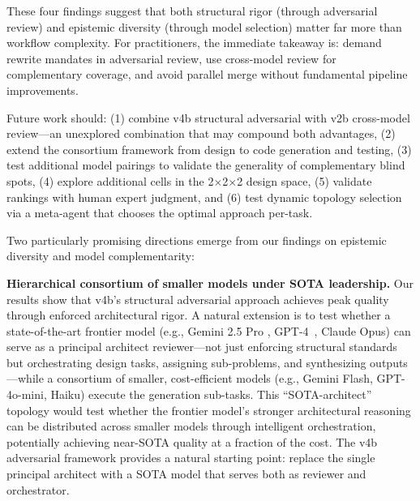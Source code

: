 \documentclass[conference]{IEEEtran}
\begin{document}
These four findings suggest that both structural rigor (through adversarial review) and epistemic diversity (through model selection) matter far more than workflow complexity. For practitioners, the immediate takeaway is: demand rewrite mandates in adversarial review, use cross-model review for complementary coverage, and avoid parallel merge without fundamental pipeline improvements.

Future work should: (1) combine v4b structural adversarial with v2b cross-model review---an unexplored combination that may compound both advantages, (2) extend the consortium framework from design to code generation and testing, (3) test additional model pairings to validate the generality of complementary blind spots, (4) explore additional cells in the 2$\times$2$\times$2 design space, (5) validate rankings with human expert judgment, and (6) test dynamic topology selection via a meta-agent that chooses the optimal approach per-task.

Two particularly promising directions emerge from our findings on epistemic diversity and model complementarity:

\textbf{Hierarchical consortium of smaller models under SOTA leadership.} Our results show that v4b's structural adversarial approach achieves peak quality through enforced architectural rigor. A natural extension is to test whether a state-of-the-art frontier model (e.g., Gemini 2.5 Pro \cite{gemini}, GPT-4~\cite{gpt4}, Claude Opus) can serve as a principal architect reviewer---not just enforcing structural standards but orchestrating design tasks, assigning sub-problems, and synthesizing outputs---while a consortium of smaller, cost-efficient models (e.g., Gemini Flash, GPT-4o-mini, Haiku) execute the generation sub-tasks. This ``SOTA-architect'' topology would test whether the frontier model's stronger architectural reasoning can be distributed across smaller models through intelligent orchestration, potentially achieving near-SOTA quality at a fraction of the cost. The v4b adversarial framework provides a natural starting point: replace the single principal architect with a SOTA model that serves both as reviewer and orchestrator.
\end{document}
